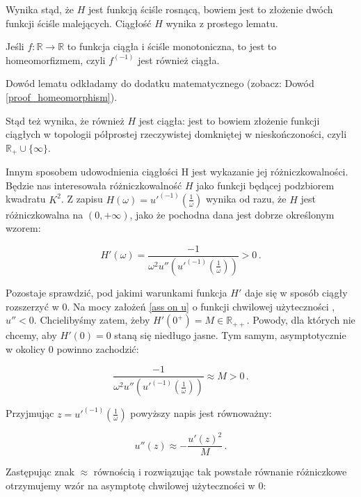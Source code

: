 Wynika stąd, że $ H $ jest funkcją ściśle rosnącą, bowiem jest to złożenie dwóch funkcji ściśle malejących. Ciągłość $ H $ wynika z prostego lematu.

\begin{lemat}\label{homomorphisms}
Jeśli $ f : \mathbb{R} \rightarrow \mathbb{R}$ to funkcja ciągła i ściśle monotoniczna, to jest to homeomorfizmem, czyli $ f^{(-1)} $ jest również ciągła. 
\end{lemat}

Dowód lematu odkładamy do dodatku matematycznego (zobacz: Dowód \ref{proof_homeomorphism}).

Stąd też wynika, że również $ H $ jest ciągła: jest to bowiem złożenie funkcji ciągłych w topologii półprostej rzeczywistej domkniętej w nieskończoności, czyli $\mathbb{R}_{+} \cup \{ \infty \}$. 

Innym sposobem udowodnienia ciągłości H jest wykazanie jej różniczkowalności. Będzie nas interesowała różniczkowalność $ H $ jako funkcji będącej podzbiorem kwadratu $ K^2 $. Z zapisu $ H(\omega) = u'^{(-1)}(\frac{1}{\omega}) $ wynika od razu, że $ H $ jest różniczkowalna na $ (0, +\infty) $, jako że pochodna dana jest dobrze określonym wzorem:

\begin{equation}\label{H'}
	H ' (\omega	) = \frac{-1}{\omega^{2} u''(u'^{(-1)}(\frac{1}{\omega})) } > 0\,.
\end{equation}

Pozostaje sprawdzić, pod jakimi warunkami funkcja $ H' $ daje się w sposób ciągły rozszerzyć w $ 0 $. 
Na mocy założeń \ref{ass on u} o funkcji chwilowej użyteczności , $ u'' < 0 $. Chcielibyśmy zatem, żeby $ H'(0^{+}) = M \in \mathbb{R}_{++} $. Powody, dla których nie chcemy, aby $H'(0)=0$ staną się niedługo jasne. Tym samym, asymptotycznie w okolicy $ 0 $ powinno zachodzić: 

\begin{equation*}
\frac{-1}{\omega^{2} u''(u'^{(-1)}(\frac{1}{\omega}))} \approx M > 0\,.
\end{equation*} 

Przyjmując $ z =  u'^{(-1)}(\frac{1}{\omega})$ powyższy napis jest równoważny:

\begin{equation*}
u''(z) \approx - \frac{u'(z)^2}{M}\,.
\end{equation*}

Zastępując znak $ \approx $ równością i rozwiązując tak powstałe równanie różniczkowe otrzymujemy wzór na asymptotę chwilowej użyteczności w 0:


